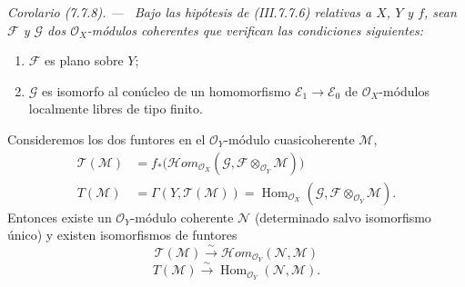 \documentclass[10pt,oneside]{book}
\newcommand{\sref}[2][]{\textup{(#2)}}
\newenvironment{corollary}[1][]{\par\medskip\noindent\itshape Corolario (#1). ---\ }{\par}
\begin{document}
\begin{corollary}[7.7.8]
\label{III.7.7.8}
Bajo las hipótesis de \textup{\sref{III.7.7.6}} relativas a $X$, $Y$ y $f$, sean
$\mathscr F$ y $\mathscr G$ dos $\mathscr O_X$-módulos coherentes que verifican
las condiciones siguientes:
\begin{enumerate}
  \item[\textup{(i)}] $\mathscr F$ es plano sobre $Y$;
  \item[\textup{(ii)}] $\mathscr G$ es isomorfo al conúcleo de un homomorfismo
    $\mathscr E_1\to\mathscr E_0$ de $\mathscr O_X$-módulos localmente libres
    de tipo finito.
\end{enumerate}
Consideremos los dos funtores en el $\mathscr O_Y$-módulo cuasicoherente
$\mathscr M$,
\begin{align*}
  \mathscr T(\mathscr M)
  &=
  f_*
  \bigl(
    \mathscr{H}\!om_{\mathscr O_X}
      (\mathscr G,\mathscr F\otimes_{\mathscr O_Y}\mathscr M)
  \bigr)\\
  T(\mathscr M)
  &=
  \Gamma(Y,\mathscr T(\mathscr M))
  =
  \operatorname{Hom}_{\mathscr O_X}
    (\mathscr G,\mathscr F\otimes_{\mathscr O_Y}\mathscr M).
\end{align*}
Entonces existe un $\mathscr O_Y$-módulo coherente $\mathscr N$ (determinado
salvo isomorfismo único) y existen isomorfismos de funtores
\[
  \mathscr T(\mathscr M)
  \xrightarrow{\sim}
  \mathscr{H}\!om_{\mathscr O_Y}(\mathscr N,\mathscr M)
  \tag{7.7.8.1}\label{III.7.7.8.1}
\]
\[
  T(\mathscr M)
  \xrightarrow{\sim}
  \operatorname{Hom}_{\mathscr O_Y}(\mathscr N,\mathscr M).
  \tag{7.7.8.2}\label{III.7.7.8.2}
\]
\end{corollary}
\end{document}
